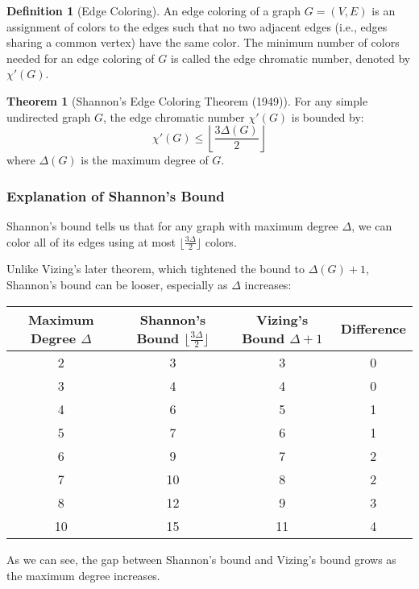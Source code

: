 \documentclass{article}
\theoremstyle{definition}
\newtheorem{theorem}{Theorem}
\newtheorem{definition}{Definition}
\begin{document}
\begin{definition}[Edge Coloring]
An edge coloring of a graph $G = (V, E)$ is an assignment of colors to the edges such that no two adjacent edges (i.e., edges sharing a common vertex) have the same color. The minimum number of colors needed for an edge coloring of $G$ is called the edge chromatic number, denoted by $\chi'(G)$.
\end{definition}


\begin{theorem}[Shannon's Edge Coloring Theorem (1949)]
For any simple undirected graph $G$, the edge chromatic number $\chi'(G)$ is bounded by:
\begin{equation}
\chi'(G) \leq \left\lfloor\frac{3\Delta(G)}{2}\right\rfloor
\end{equation}
where $\Delta(G)$ is the maximum degree of $G$.
\end{theorem}

\subsubsection{Explanation of Shannon's Bound}

Shannon's bound tells us that for any graph with maximum degree $\Delta$, we can color all of its edges using at most $\lfloor\frac{3\Delta}{2}\rfloor$ colors.

Unlike Vizing's later theorem, which tightened the bound to $\Delta(G) + 1$, Shannon's bound can be looser, especially as $\Delta$ increases:

\begin{center}
\begin{tabular}{|c|c|c|c|}
\hline
Maximum Degree $\Delta$ & Shannon's Bound $\lfloor\frac{3\Delta}{2}\rfloor$ & Vizing's Bound $\Delta + 1$ & Difference \\
\hline
2 & 3 & 3 & 0 \\
3 & 4 & 4 & 0 \\
4 & 6 & 5 & 1 \\
5 & 7 & 6 & 1 \\
6 & 9 & 7 & 2 \\
7 & 10 & 8 & 2 \\
8 & 12 & 9 & 3 \\
10 & 15 & 11 & 4 \\
\hline
\end{tabular}
\end{center}

As we can see, the gap between Shannon's bound and Vizing's bound grows as the maximum degree increases.
\end{document}
